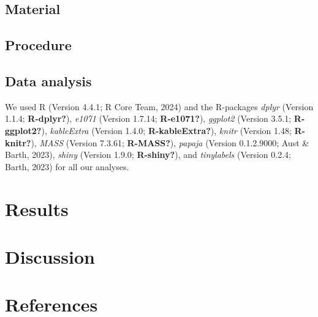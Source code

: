 \documentclass[
  man]{apa7}
\begin{document}
\subsection{Material}\label{material}

\subsection{Procedure}\label{procedure}

\subsection{Data analysis}\label{data-analysis}

We used R (Version 4.4.1; R Core Team, 2024) and the R-packages \emph{dplyr} (Version 1.1.4; \textbf{R-dplyr?}), \emph{e1071} (Version 1.7.14; \textbf{R-e1071?}), \emph{ggplot2} (Version 3.5.1; \textbf{R-ggplot2?}), \emph{kableExtra} (Version 1.4.0; \textbf{R-kableExtra?}), \emph{knitr} (Version 1.48; \textbf{R-knitr?}), \emph{MASS} (Version 7.3.61; \textbf{R-MASS?}), \emph{papaja} (Version 0.1.2.9000; Aust \& Barth, 2023), \emph{shiny} (Version 1.9.0; \textbf{R-shiny?}), and \emph{tinylabels} (Version 0.2.4; Barth, 2023) for all our analyses.

\section{Results}\label{results}

\section{Discussion}\label{discussion}

\newpage

\section{References}\label{references}
\end{document}
